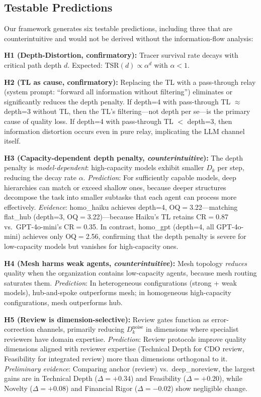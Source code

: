 \documentclass[conference]{IEEEtran}
\begin{document}
\subsection{Testable Predictions}
\label{subsec:testable}

Our framework generates six testable predictions, including three that are counterintuitive and would not be derived without the information-flow analysis:

\textbf{H1 (Depth-Distortion, confirmatory):}
Tracer survival rate decays with critical path depth $d$.
Expected: $\text{TSR}(d) \propto \alpha^d$ with $\alpha < 1$.

\textbf{H2 (TL as cause, confirmatory):}
Replacing the TL with a pass-through relay (system prompt: ``forward all information without filtering'') eliminates or significantly reduces the depth penalty.
If depth=4 with pass-through TL $\approx$ depth=3 without TL, then the TL's filtering---not depth per se---is the primary cause of quality loss.
If depth=4 with pass-through TL $<$ depth=3, then information distortion occurs even in pure relay, implicating the LLM channel itself.

\textbf{H3 (Capacity-dependent depth penalty, \emph{counterintuitive}):}
The depth penalty is \emph{model-dependent}: high-capacity models exhibit smaller $D_k$ per step, reducing the decay rate $\alpha$.
\emph{Prediction}: For sufficiently capable models, deep hierarchies can match or exceed shallow ones, because deeper structures decompose the task into smaller subtasks that each agent can process more effectively.
\emph{Evidence}: homo\_haiku achieves depth=4, OQ$=$3.22---matching flat\_hub (depth=3, OQ$=$3.22)---because Haiku's TL retains CR$=$0.87 vs.\ GPT-4o-mini's CR$=$0.35.
In contrast, homo\_gpt (depth=4, all GPT-4o-mini) achieves only OQ$=$2.56, confirming that the depth penalty is severe for low-capacity models but vanishes for high-capacity ones.

\textbf{H4 (Mesh harms weak agents, \emph{counterintuitive}):}
Mesh topology \emph{reduces} quality when the organization contains low-capacity agents, because mesh routing saturates them.
\emph{Prediction}: In heterogeneous configurations (strong + weak models), hub-and-spoke outperforms mesh; in homogeneous high-capacity configurations, mesh outperforms hub.

\textbf{H5 (Review is dimension-selective):}
Review gates function as error-correction channels, primarily reducing $D_k^{\text{noise}}$ in dimensions where specialist reviewers have domain expertise.
\emph{Prediction}: Review protocols improve quality dimensions aligned with reviewer expertise (Technical Depth for CDO review, Feasibility for integrated review) more than dimensions orthogonal to it.
\emph{Preliminary evidence}: Comparing anchor (review) vs.\ deep\_noreview, the largest gains are in Technical Depth ($\Delta = +0.34$) and Feasibility ($\Delta = +0.20$), while Novelty ($\Delta = +0.08$) and Financial Rigor ($\Delta = -0.02$) show negligible change.
\end{document}
